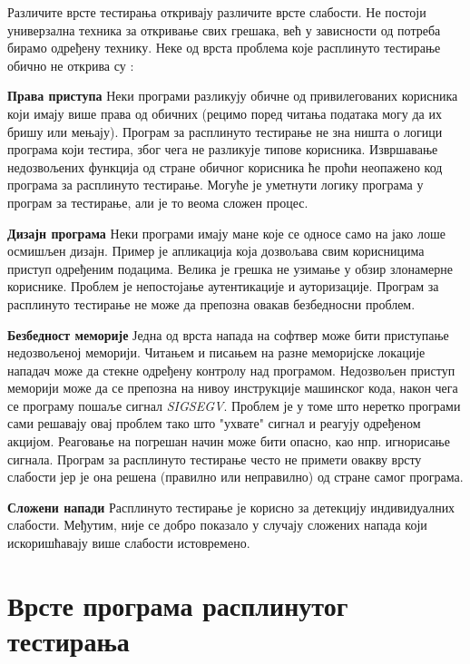\documentclass[12pt,oneside]{memoir}
\begin{document}
Различите врсте тестирања откривају различите врсте слабости. Не постоји универзална техника за откривање свих грешака, већ у зависности од потреба бирамо одређену технику. Неке од врста проблема које расплинуто тестирање обично не открива су \cite{fuzzingBrute}:
\begin{description}
\item \textbf{Права приступа} Неки програми разликују обичне од привилегованих корисника који имају више права од обичних (рецимо поред читања података могу да их бришу или мењају). Програм за расплинуто тестирање не зна ништа о логици програма који тестира, због чега не разликује типове корисника. Извршавање недозвољених функција од стране обичног корисника ће проћи неопажено код програма за расплинуто тестирање. Могуће је уметнути логику програма у програм за тестирање, али је то веома сложен процес.  
\item \textbf{Дизајн програма} Неки програми имају мане које се односе само на јако лоше осмишљен дизајн. Пример је апликација која дозвољава свим корисницима приступ одређеним подацима. Велика је грешка не узимање у обзир злонамерне кориснике. Проблем је непостојање аутентикације и ауторизације. Програм за расплинуто тестирање не може да препозна овакав безбедносни проблем.
\item \textbf{Безбедност меморије} Једна од врста напада на софтвер може бити приступање недозвољеној меморији. Читањем и писањем на разне меморијске локације нападач може да стекне одређену контролу над програмом. Недозвољен приступ меморији може да се препозна на нивоу инструкције машинског кода, након чега се програму пошаље сигнал \textit{SIGSEGV}. Проблем је у томе што неретко програми сами решавају овај проблем тако што "ухвате" сигнал и реагују одређеном акцијом. Реаговање на погрешан начин може бити опасно, као нпр. игнорисање сигнала. Програм за расплинуто тестирање често не примети овакву врсту слабости јер је она решена (правилно или неправилно) од стране самог програма.
\item \textbf{Сложени напади} Расплинуто тестирање је корисно за детекцију индивидуалних слабости. Међутим, није се добро показало у случају сложених напада који искоришћавају више слабости истовремено.
\end{description}

\section{Врсте програма расплинутог тестирања}
\label{sec:vrsteProRaspTest}
\end{document}
